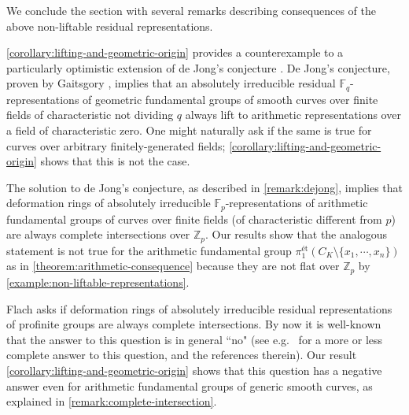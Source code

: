 We conclude the section with several remarks describing consequences of the
above non-liftable residual representations.
\begin{remark}
\notready\label{remark:dejong}
\autoref{corollary:lifting-and-geometric-origin} provides a counterexample to a particularly optimistic extension of de Jong's conjecture \cite[Conjecture 2.3, Theorem 3.5]{de2001conjecture}.	De Jong's conjecture, proven by Gaitsgory \cite{gaitsgory2007jong}, implies that an absolutely irreducible residual $\mathbb{F}_q$-representations of geometric fundamental groups of smooth curves over finite fields of characteristic not dividing $q$ always lift to arithmetic representations over a field of characteristic zero. One might naturally ask if the same is true for curves over arbitrary finitely-generated fields; \autoref{corollary:lifting-and-geometric-origin} shows that this is not the case.
\end{remark}
\begin{remark}
\notready
	\label{remark:complete-intersection}
	The solution to de Jong's conjecture, as described in
	\autoref{remark:dejong}, implies that deformation rings of
absolutely irreducible $\mathbb{F}_p$-representations of arithmetic fundamental
groups of curves over finite fields (of characteristic different from $p$) are
always complete intersections over $\mathbb{Z}_p$. Our results show that the
analogous statement is not true for the arithmetic fundamental group
$\pi_1^{\text{\'et}}(C_{K}\setminus\{x_1, \cdots, x_n\})$ as in
\autoref{theorem:arithmetic-consequence} because they are not flat over $\mathbb
Z_p$ by \autoref{example:non-liftable-representations}.
\end{remark}
\begin{remark}
\notready
	\label{remark:flach}
	Flach asks  \cite[p.~7]{cornelissen2005problems} if deformation rings of
	absolutely irreducible residual representations of profinite groups are
	always complete intersections. By now it is well-known that the answer
	to this question is in general ``no" (see e.g.~\cite{eardley2016inverse}
	for a more or less complete answer to this question, and the references
therein). Our result \autoref{corollary:lifting-and-geometric-origin} shows that
this question has a negative answer even for arithmetic fundamental groups of
generic smooth  curves, as explained in \autoref{remark:complete-intersection}.
\end{remark}
